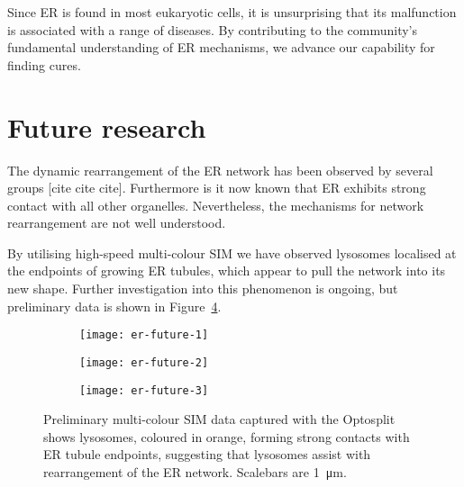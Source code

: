 Since ER is found in most eukaryotic cells, it is unsurprising that its malfunction is associated with a range of diseases. 
By contributing to the community's fundamental understanding of ER mechanisms, we advance our capability for finding cures. 

\section{Future research} \label{sec:ERfuture}
The dynamic rearrangement of the ER network has been observed by several groups [cite cite cite]. 
Furthermore is it now known that ER exhibits strong contact with all other organelles. 
Nevertheless, the mechanisms for network rearrangement are not well understood. 

By utilising high-speed multi-colour SIM we have observed lysosomes localised at the endpoints of growing ER tubules, which appear to pull the network into its new shape. 
Further investigation into this phenomenon is ongoing, but preliminary data is shown in Figure~\ref{fig:er-future}. 

\begin{figure}[htbp!]
	\centering
		\begin{subfigure}[b]{0.325\textwidth}
		\texttt{[image: er-future-1]}
		\caption{} \label{fig:er-future-1}
	\end{subfigure}	
	\hfill
	\begin{subfigure}[b]{0.325\textwidth}
		\texttt{[image: er-future-2]}
		\caption{} \label{fig:er-future-2}
	\end{subfigure}
	\hfill
	\begin{subfigure}[b]{0.325\textwidth}
		\texttt{[image: er-future-3]}
		\caption{} \label{fig:er-future-3}
	\end{subfigure}
	\caption[ER: Lysosomes form strong contacts with ER tubule endpoints to rearrange the network]{Preliminary multi-colour SIM data captured with the Optosplit shows lysosomes, coloured in orange, forming strong contacts with ER tubule endpoints, suggesting that lysosomes assist with rearrangement of the ER network. Scalebars are \SI{1}{\micro\metre}.}
	\label{fig:er-future}
\end{figure}


